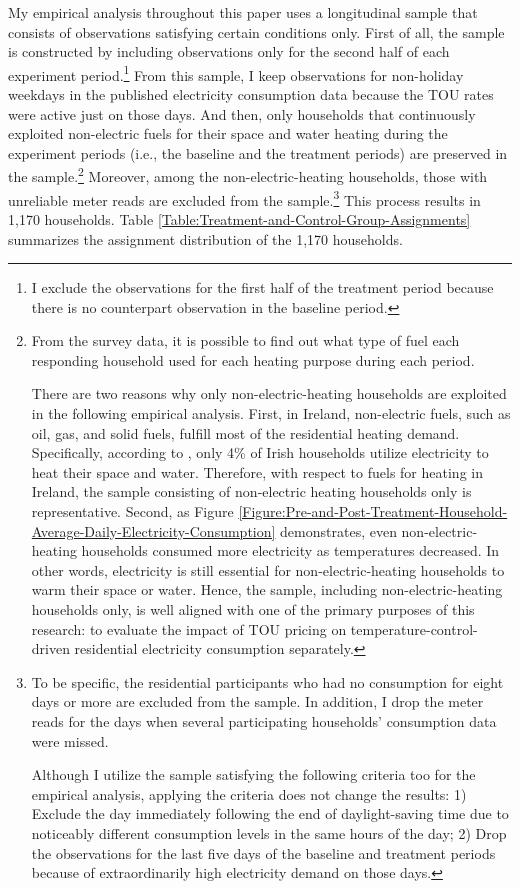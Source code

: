 My empirical analysis throughout this paper uses a longitudinal sample that consists of observations satisfying certain conditions only. First of all, the sample is constructed by including observations only for the second half of each experiment period.\footnote{I exclude the observations for the first half of the treatment period because there is no counterpart observation in the baseline period.} From this sample, I keep observations for non-holiday weekdays in the published electricity consumption data because the TOU rates were active just on those days. And then, only households that continuously exploited non-electric fuels for their space and water heating during the experiment periods (i.e., the baseline and the treatment periods) are preserved in the sample.\footnote{From the survey data, it is possible to find out what type of fuel each responding household used for each heating purpose during each period. \par
There are two reasons why only non-electric-heating households are exploited in the following empirical analysis. First, in Ireland, non-electric fuels, such as oil, gas, and solid fuels, fulfill most of the residential heating demand. Specifically, according to \cite{Heating-and-Cooling-in-Ireland-Today_SEAI_2022}, only 4\% of Irish households utilize electricity to heat their space and water. Therefore, with respect to fuels for heating in Ireland, the sample consisting of non-electric heating households only is representative. Second, as Figure \ref{Figure:Pre-and-Post-Treatment-Household-Average-Daily-Electricity-Consumption} demonstrates, even non-electric-heating households consumed more electricity as temperatures decreased. In other words, electricity is still essential for non-electric-heating households to warm their space or water. Hence, the sample, including non-electric-heating households only, is well aligned with one of the primary purposes of this research: to evaluate the impact of TOU pricing on temperature-control-driven residential electricity consumption separately.} Moreover, among the non-electric-heating households, those with unreliable meter reads are excluded from the sample.\footnote{To be specific, the residential participants who had no consumption for eight days or more are excluded from the sample. In addition, I drop the meter reads for the days when several participating households' consumption data were missed. \par
Although I utilize the sample satisfying the following criteria too for the empirical analysis, applying the criteria does not change the results: 1) Exclude the day immediately following the end of daylight-saving time due to noticeably different consumption levels in the same hours of the day; 2) Drop the observations for the last five days of the baseline and treatment periods because of extraordinarily high electricity demand on those days.} This process results in 1,170 households. Table \ref{Table:Treatment-and-Control-Group-Assignments} summarizes the assignment distribution of the 1,170 households. 

